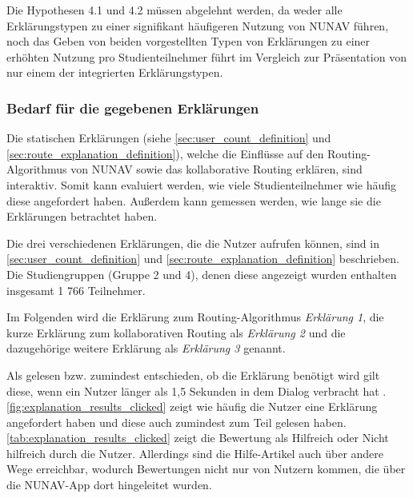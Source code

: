 Die Hypothesen 4.1 und 4.2 müssen abgelehnt werden, da weder alle Erklärungstypen zu einer signifikant häufigeren Nutzung von NUNAV führen, noch das Geben von beiden vorgestellten Typen von Erklärungen zu einer erhöhten Nutzung pro Studienteilnehmer führt im Vergleich zur Präsentation von nur einem der integrierten Erklärungstypen.

\subsubsection{Bedarf für die gegebenen Erklärungen}

Die statischen Erklärungen (siehe \autoref{sec:user_count_definition} und \autoref{sec:route_explanation_definition}), welche die Einflüsse auf den Routing-Algorithmus von NUNAV sowie das kollaborative Routing erklären, sind interaktiv. Somit kann evaluiert werden, wie viele Studienteilnehmer wie häufig diese angefordert haben. Außerdem kann gemessen werden, wie lange sie die Erklärungen betrachtet haben.

Die drei verschiedenen Erklärungen, die die Nutzer aufrufen können, sind in \autoref{sec:user_count_definition} und \autoref{sec:route_explanation_definition} beschrieben. Die Studiengruppen (Gruppe 2 und 4), denen diese angezeigt wurden enthalten insgesamt 1 766 Teilnehmer.

Im Folgenden wird die Erklärung zum Routing-Algorithmus \textit{Erklärung 1}, die kurze Erklärung zum kollaborativen Routing als \textit{Erklärung 2} und die dazugehörige weitere Erklärung als \textit{Erklärung 3} genannt.

Als gelesen bzw. zumindest entschieden, ob die Erklärung benötigt wird gilt diese, wenn ein Nutzer länger als 1,5 Sekunden in dem Dialog verbracht hat \cite{BAHR2011776}. \autoref{fig:explanation_results_clicked} zeigt wie häufig die Nutzer eine Erklärung angefordert haben und diese auch zumindest zum Teil gelesen haben. \autoref{tab:explanation_results_clicked} zeigt die Bewertung als \glqq Hilfreich\grqq{} oder \glqq Nicht hilfreich\grqq{} durch die Nutzer. Allerdings sind die Hilfe-Artikel auch über andere Wege erreichbar, wodurch Bewertungen nicht nur von Nutzern kommen, die über die NUNAV-App dort hingeleitet wurden.

